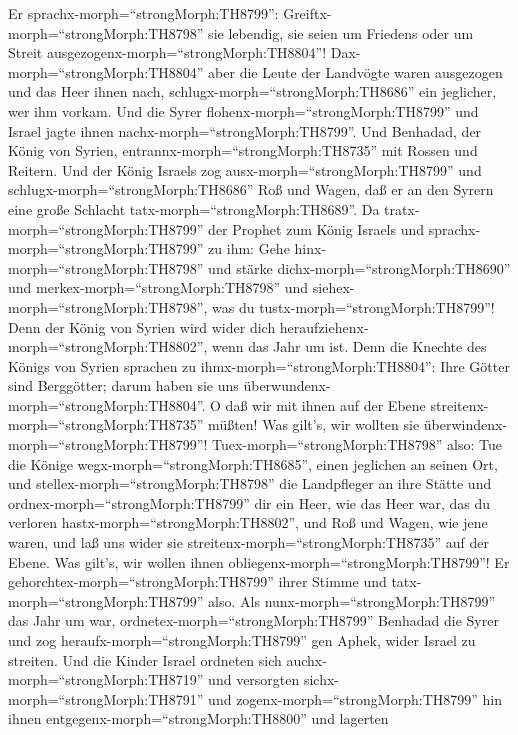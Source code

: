 Er sprachx-morph=``strongMorph:TH8799'':
Greiftx-morph=``strongMorph:TH8798'' sie lebendig, sie seien um Friedens
oder um Streit ausgezogenx-morph=``strongMorph:TH8804''! 
Dax-morph=``strongMorph:TH8804'' aber die Leute der Landvögte waren
ausgezogen und das Heer ihnen nach, 
schlugx-morph=``strongMorph:TH8686'' ein jeglicher, wer ihm vorkam. Und
die Syrer flohenx-morph=``strongMorph:TH8799'' und Israel jagte ihnen
nachx-morph=``strongMorph:TH8799''. Und Benhadad, der König von Syrien,
entrannx-morph=``strongMorph:TH8735'' mit Rossen und Reitern.
 Und der König Israels zog
ausx-morph=``strongMorph:TH8799'' und
schlugx-morph=``strongMorph:TH8686'' Roß und Wagen, daß er an den Syrern
eine große Schlacht tatx-morph=``strongMorph:TH8689''.  Da
tratx-morph=``strongMorph:TH8799'' der Prophet zum König Israels und
sprachx-morph=``strongMorph:TH8799'' zu ihm: Gehe
hinx-morph=``strongMorph:TH8798'' und stärke
dichx-morph=``strongMorph:TH8690'' und
merkex-morph=``strongMorph:TH8798'' und
siehex-morph=``strongMorph:TH8798'', was du
tustx-morph=``strongMorph:TH8799''! Denn der König von Syrien wird wider
dich heraufziehenx-morph=``strongMorph:TH8802'', wenn das Jahr um ist.
 Denn die Knechte des Königs von Syrien sprachen zu
ihmx-morph=``strongMorph:TH8804'': Ihre Götter sind Berggötter; darum
haben sie uns überwundenx-morph=``strongMorph:TH8804''. O daß wir mit
ihnen auf der Ebene streitenx-morph=``strongMorph:TH8735'' müßten! Was
gilt's, wir wollten sie überwindenx-morph=``strongMorph:TH8799''!
 Tuex-morph=``strongMorph:TH8798'' also: Tue die Könige
wegx-morph=``strongMorph:TH8685'', einen jeglichen an seinen Ort, und
stellex-morph=``strongMorph:TH8798'' die Landpfleger an ihre Stätte
 und ordnex-morph=``strongMorph:TH8799'' dir ein Heer, wie
das Heer war, das du verloren hastx-morph=``strongMorph:TH8802'', und
Roß und Wagen, wie jene waren, und laß uns wider sie
streitenx-morph=``strongMorph:TH8735'' auf der Ebene. Was gilt's, wir
wollen ihnen obliegenx-morph=``strongMorph:TH8799''! Er
gehorchtex-morph=``strongMorph:TH8799'' ihrer Stimme und
tatx-morph=``strongMorph:TH8799'' also.  Als
nunx-morph=``strongMorph:TH8799'' das Jahr um war,
ordnetex-morph=``strongMorph:TH8799'' Benhadad die Syrer und zog
heraufx-morph=``strongMorph:TH8799'' gen Aphek, wider Israel zu
streiten.  Und die Kinder Israel ordneten sich
auchx-morph=``strongMorph:TH8719'' und versorgten
sichx-morph=``strongMorph:TH8791'' und
zogenx-morph=``strongMorph:TH8799'' hin ihnen
entgegenx-morph=``strongMorph:TH8800'' und lagerten
